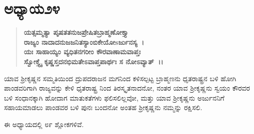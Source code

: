 \section*{ಅಧ್ಯಾಯ\enginline{-}೨೪}

\begin{verse}
\textbf{ಯತ್ಸಮ್ಮತ್ಯಾ ಪೃಷತತನುಜಪ್ರೇಷಿತಬ್ರಾಹ್ಮಣೋಕ್ತ್ಯಾ }\\\textbf{ರಾಜ್ಯಂ ನಾದಾದನುಜಜನಿತಸ್ಯಾಂಬಿಕೇಯೋsರ್ಜುನಸ್ಯ~।}\\\textbf{ಯಃ ಸಾಹಾಯ್ಯಂ ವ್ಯಧಿತನಗರೀಂ ಕೌರವಾಣಾಮವಾಪ್ತಃ }\\\textbf{ಸ್ವೋಕ್ತ್ಯೈ ಕೃಷ್ಣಸ್ತದನಭಿಮತೇಽವಾಪ್ತಪಾರ್ಥಃ ಸ ನೋಽವ್ಯಾತ್~।।}
\end{verse}

ಯಾವ ಶ‍್ರೀಕೃಷ್ಣನ ಸಮ್ಮತಿಯಿಂದ ದ್ರುಪದರಾಜನ ಮಗನಿಂದ ಕಳಿಸಲ್ಪಟ್ಟ ಬ್ರಾಹ್ಮಣನು ಧೃತರಾಷ್ಟ್ರನ ಬಳಿ ಹೋಗಿ ಪಾಂಡವರಿಗಾಗಿ ರಾಜ್ಯವನ್ನು ಕೇಳಿ ಧೃತರಾಷ್ಟ್ರ ನಿಂದ ತಿರಸ್ಕೃತನಾದನೋ, ನಂತರ ಯಾವ ಶ‍್ರೀಕೃಷ್ಣನು ಸ್ವಯಂ ಕೌರವರ ಬಳಿ ಸಂಧಾನಕ್ಕಾಗಿ ಹೋದಾಗ ಮಾತುಕತೆಗಳು ಫಲಿಸಲಿಲ್ಲವೋ, ಮತ್ತು ಯಾವ ಶ‍್ರೀಕೃಷ್ಣನು ಅರ್ಜುನನಿಗೆ ಸಹಾಯಮಾಡಲು ಪಾಂಡವರ ಬಳಿ ಪುನಃ ಬಂದನೋ ಅಂತಹ ಶ‍್ರೀಕೃಷ್ಣನು ನಮ್ಮನ್ನು ರಕ್ಷಿಸಲಿ.

ಈ ಅಧ್ಯಾಯದಲ್ಲಿ ೮೯ ಶ್ಲೋಕಗಳಿವೆ.

